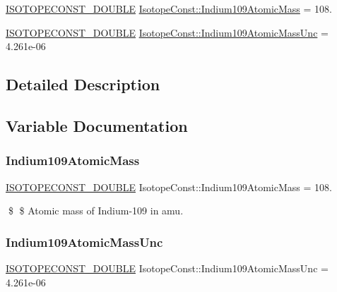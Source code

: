 \begin{DoxyCompactItemize}
\item 
\mbox{\hyperlink{group___isotope_const-_macros_ga8f45a7272ce02c0b4c65c44636ed719a}{I\+S\+O\+T\+O\+P\+E\+C\+O\+N\+S\+T\+\_\+\+D\+O\+U\+B\+LE}} \mbox{\hyperlink{group___isotope_const-_indium-_in109_ga21c42aa33447f5e32da6ecfa471a365e}{Isotope\+Const\+::\+Indium109\+Atomic\+Mass}} = 108.
\item 
\mbox{\hyperlink{group___isotope_const-_macros_ga8f45a7272ce02c0b4c65c44636ed719a}{I\+S\+O\+T\+O\+P\+E\+C\+O\+N\+S\+T\+\_\+\+D\+O\+U\+B\+LE}} \mbox{\hyperlink{group___isotope_const-_indium-_in109_ga173ac934601f4fc0d87a7b818714b48f}{Isotope\+Const\+::\+Indium109\+Atomic\+Mass\+Unc}} = 4.\+261e-\/06
\end{DoxyCompactItemize}


\subsection{Detailed Description}


\subsection{Variable Documentation}
\mbox{\label{group___isotope_const-_indium-_in109_ga21c42aa33447f5e32da6ecfa471a365e}} 
\subsubsection{\texorpdfstring{Indium109\+Atomic\+Mass}{Indium109AtomicMass}}
{\footnotesize\ttfamily \mbox{\hyperlink{group___isotope_const-_macros_ga8f45a7272ce02c0b4c65c44636ed719a}{I\+S\+O\+T\+O\+P\+E\+C\+O\+N\+S\+T\+\_\+\+D\+O\+U\+B\+LE}} Isotope\+Const\+::\+Indium109\+Atomic\+Mass = 108.}

\$ \$ Atomic mass of Indium-\/109 in amu. \mbox{\label{group___isotope_const-_indium-_in109_ga173ac934601f4fc0d87a7b818714b48f}} 
\subsubsection{\texorpdfstring{Indium109\+Atomic\+Mass\+Unc}{Indium109AtomicMassUnc}}
{\footnotesize\ttfamily \mbox{\hyperlink{group___isotope_const-_macros_ga8f45a7272ce02c0b4c65c44636ed719a}{I\+S\+O\+T\+O\+P\+E\+C\+O\+N\+S\+T\+\_\+\+D\+O\+U\+B\+LE}} Isotope\+Const\+::\+Indium109\+Atomic\+Mass\+Unc = 4.\+261e-\/06}

